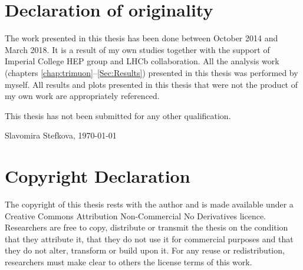 \chapter*{Declaration of originality}
The work presented in this thesis has been done between October 2014 and March 2018. It is a result of my own studies together with the support of Imperial College HEP group and LHCb collaboration. All the analysis work (chapters \ref{chap:trimuon}--\ref{Sec:Results}) presented in this thesis was performed by myself. All results and plots presented in this thesis that were not the product of my own work are appropriately referenced. %

\vspace{1cm}
This thesis has not been submitted for any other qualification.

\vspace{1cm}



Slavomira Stefkova, \vspace{1cm} \today


\vspace{5cm}

\clearpage
{}
{}
\chapter*{Copyright Declaration}
The copyright of this thesis rests with the author and is made available under a Creative Commons Attribution Non-Commercial No Derivatives licence. Researchers are free to copy, distribute or transmit the thesis on the condition that they attribute it, that they do not use it for commercial purposes and that they do not alter, transform or build upon it. For any reuse or redistribution, researchers must make clear to others the license terms of this work.
